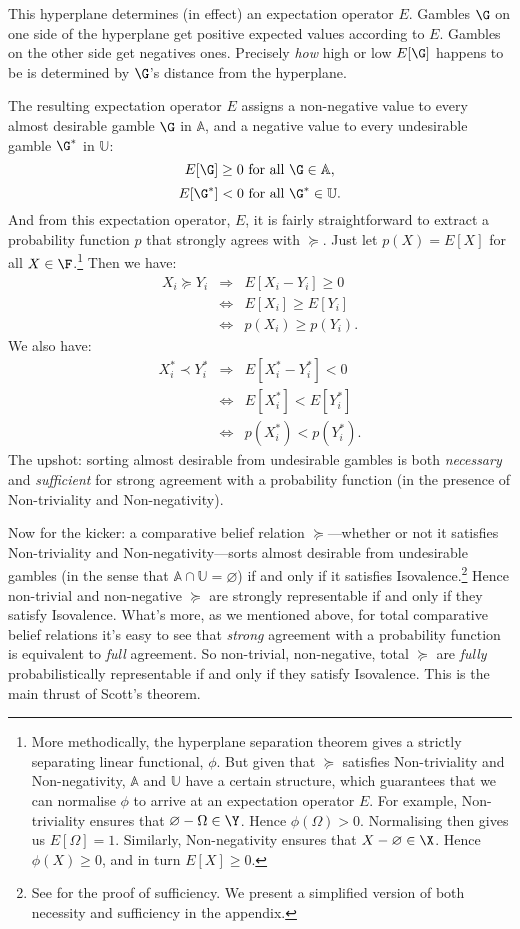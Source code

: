 This hyperplane determines (in effect) an expectation operator $E$. Gambles $\G$ on one side of the hyperplane get positive expected values according to $E$. Gambles on the other side get negatives ones. Precisely \textit{how} high or low $E[\G]$ happens to be is determined by $\G$'s distance from the hyperplane.

The resulting expectation operator $E$ assigns a non-negative value to every almost desirable gamble $\G$ in $\mathbb{A}$, and a negative value to every undesirable gamble $\G^*$ in $\mathbb{U}$:
$$E[\G]\geq 0 \text{ for all } \G\in\mathbb{A},$$
$$E[\G^*]<0   \text{ for all } \G^*\in\mathbb{U}.$$
And from this expectation operator, $E$, it is fairly straightforward to extract a probability function $p$ that strongly agrees with $\succeq$. Just let $p(X)=E[X]$ for all $X\in\F$.\footnote{More methodically, the hyperplane separation theorem gives a strictly separating linear functional, $\phi$. But given that $\succeq$ satisfies Non-triviality and Non-negativity, $\mathbb{A}$ and $\mathbb{U}$ have a certain structure, which guarantees that we can normalise $\phi$ to arrive at an expectation operator $E$. For example, Non-triviality ensures that $\varnothing-\Omega\in\Y$. Hence $\phi(\Omega)>0$. Normalising then gives us $E[\Omega]=1$. Similarly, Non-negativity ensures that $X-\varnothing\in\X$. Hence $\phi(X)\geq0$, and in turn $E[X]\geq0$.} Then we have:
\begin{eqnarray*}
X_i\succeq Y_i & \Rightarrow & E[X_i-Y_i]\geq 0\\
& \Leftrightarrow & E[X_i]\geq E[Y_i]\\
& \Leftrightarrow & p(X_i)\geq p(Y_i).
\end{eqnarray*}
We also have:
\begin{eqnarray*}
X^*_i\prec Y^*_i & \Rightarrow & E[X^*_i-Y^*_i]< 0\\
& \Leftrightarrow & E[X^*_i]< E[Y^*_i]\\
& \Leftrightarrow & p(X^*_i)< p(Y^*_i).
\end{eqnarray*}
The upshot: sorting almost desirable from undesirable gambles is both \textit{necessary} and \textit{sufficient} for strong agreement with a probability function (in the presence of Non-triviality and Non-negativity).

Now for the kicker: a comparative belief relation $\succeq$---whether or not it satisfies Non-triviality and Non-negativity---sorts almost desirable from undesirable gambles (in the sense that $\mathbb{A}\cap\mathbb{U}=\varnothing$) if and only if it satisfies Isovalence.\footnote{See \citet[pp. 235--6]{Scott1964} for the proof of sufficiency. We present a simplified version of both necessity and sufficiency in the appendix.} Hence non-trivial and non-negative $\succeq$ are strongly representable if and only if they satisfy Isovalence. What's more, as we mentioned above, for total comparative belief relations it's easy to see that \textit{strong} agreement with a probability function is equivalent to \textit{full} agreement. So non-trivial, non-negative, total $\succeq$ are \textit{fully} probabilistically representable if and only if they satisfy Isovalence. This is the main thrust of Scott's theorem.


